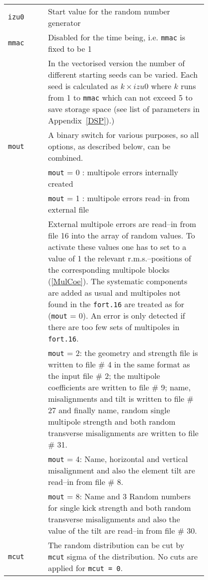 \bigskip
\begin{longtabu}{@{}lp{0.8\linewidth}}
    \texttt{izu0} & Start value for the random number generator \\
    \texttt{mmac} & {\color{notered} Disabled for the time being, i.e. \texttt{mmac} is fixed to be 1} \\
                  & In the vectorised version the number of different starting seeds can be varied. Each seed is calculated as \mbox{$ k \times izu0 $} where $k$ runs from 1 to \texttt{mmac} which can not exceed 5 to save storage space (see    list of parameters in Appendix~\ref{DSP}).) \\
    \texttt{mout} & A binary switch for various purposes, so all options, as described below, can be combined. \\
                  & \texttt{mout} = 0 : multipole errors internally created \\
                  & \texttt{mout} = 1 : multipole errors read--in from external file \\
                  & External multipole errors are read--in from file 16 into the array of random values. To activate these values one has to set to a value of 1 the relevant r.m.s.--positions of the corresponding multipole blocks (\ref{MulCoe}). The systematic components are added as usual and multipoles not found in the \texttt{fort.16} are treated as for (\texttt{mout} = 0). An error is only detected if there are too few sets of multipoles in \texttt{fort.16}. \\
                  & \texttt{mout} = 2: the geometry and strength file is written to file \# 4 in the same format as the input file \# 2; the multipole coefficients are written to file \# 9; name, misalignments and tilt is written to file \# 27 and finally name, random single multipole  strength and both random transverse misalignments are written to  file \# 31.\\
                  & \texttt{mout} = 4: Name, horizontal and vertical misalignment and also the element tilt are read--in from file \# 8.\\
                  & \texttt{mout} = 8: Name and 3 Random numbers for single kick strength and both random transverse misalignments and also the value of the tilt are read--in from file \# 30. \\
    \texttt{mcut} & The random distribution can be cut by \texttt{mcut} sigma of the distribution. No cuts are applied for \texttt{mcut = 0}.
\end{longtabu}

